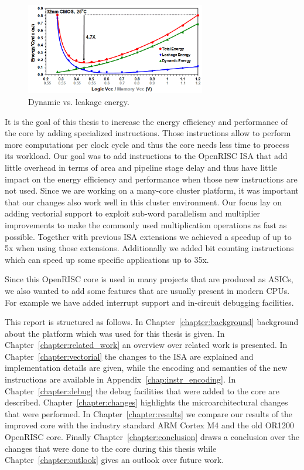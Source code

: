 \begin{figure}[H]
  \centering \includegraphics[width=0.7\textwidth]{./figures/dyn_leakage}
  \caption{Dynamic vs. leakage energy.}
  \label{fig:dyn_leakage}
\end{figure}

It is the goal of this thesis to increase the energy efficiency and performance
of the \orion core by adding specialized instructions. Those instructions allow
to perform more computations per clock cycle and thus the core needs less time
to process its workload.
Our goal was to add instructions to the OpenRISC \gls{ISA} that add little
overhead in terms of area and pipeline stage delay and thus have little impact
on the energy efficiency and performance when those new instructions are not
used. Since we are working on a many-core cluster platform, it was important
that our changes also work well in this cluster environment. Our focus lay on
adding vectorial support to exploit sub-word parallelism and multiplier
improvements to make the commonly used multiplication operations as fast as
possible. Together with previous \gls{ISA} extensions we achieved a speedup of
up to 5x when using those extensions. Additionally we added bit counting
instructions which can speed up some specific applications up to 35x.

Since this OpenRISC core is used in many projects that are produced as
\glspl{ASIC}, we also wanted to add some features that are usually present in
modern \glspl{CPU}. For example we have added interrupt support and in-circuit
debugging facilities.

This report is structured as follows. In Chapter~\ref{chapter:background} 
background about the platform which was used for this thesis is given.
In Chapter~\ref{chapter:related_work} an overview over related work is
presented.
In Chapter~\ref{chapter:vectorial} the changes to the \gls{ISA} are explained
and  implementation details are given, while the encoding and semantics of
the new instructions are available in Appendix~\ref{chap:instr_encoding}.
In Chapter~\ref{chapter:debug} the debug facilities that were added to the core
are described.
Chapter~\ref{chapter:changes} highlights the microarchitectural changes that
were performed.
In Chapter~\ref{chapter:results} we compare our results of the improved \orion
core with the industry standard ARM Cortex M4 and the old OR1200 OpenRISC core.
Finally Chapter~\ref{chapter:conclusion} draws a conclusion over the changes
that were done to the core during this thesis while
Chapter~\ref{chapter:outlook} gives an outlook over future work.




